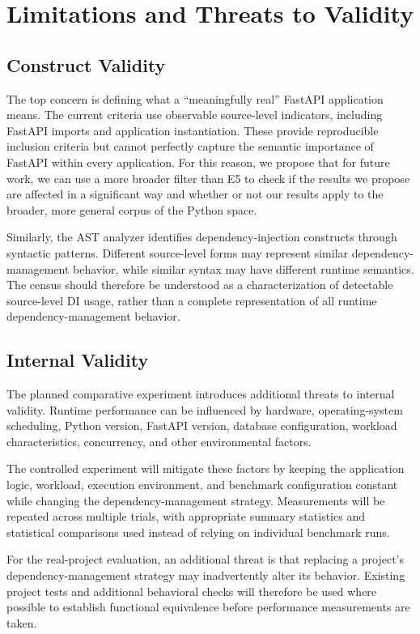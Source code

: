 \section{Limitations and Threats to Validity}

\subsection{Construct Validity}

The top concern is defining what a ``meaningfully real'' FastAPI application means. The current criteria use observable source-level indicators, including FastAPI imports and application instantiation. These provide reproducible inclusion criteria but cannot perfectly capture the semantic importance of FastAPI within every application. For this reason, we propose that for future work, we can use a more broader filter than E5 to check if the results we propose are affected in a significant way and whether or not our results apply to the broader, more general corpus of the Python space.

Similarly, the AST analyzer identifies dependency-injection constructs through syntactic patterns. Different source-level forms may represent similar dependency-management behavior, while similar syntax may have different runtime semantics. The census should therefore be understood as a characterization of detectable source-level DI usage, rather than a complete representation of all runtime dependency-management behavior.

\subsection{Internal Validity}

The planned comparative experiment introduces additional threats to internal validity. Runtime performance can be influenced by hardware, operating-system scheduling, Python version, FastAPI version, database configuration, workload characteristics, concurrency, and other environmental factors.

The controlled experiment will mitigate these factors by keeping the application logic, workload, execution environment, and benchmark configuration constant while changing the dependency-management strategy. Measurements will be repeated across multiple trials, with appropriate summary statistics and statistical comparisons used instead of relying on individual benchmark runs.

For the real-project evaluation, an additional threat is that replacing a project's dependency-management strategy may inadvertently alter its behavior. Existing project tests and additional behavioral checks will therefore be used where possible to establish functional equivalence before performance measurements are taken.

